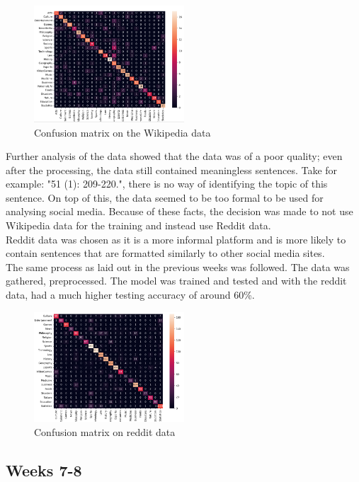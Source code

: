 \begin{figure}[htbp]
    \centering
    \includegraphics[width=0.5\textwidth]{../images/wiki-confusion.png}
    \caption{Confusion matrix on the Wikipedia data}
    \label{fig:wikiconf}
\end{figure}
Further analysis of the data showed that
the data was of a poor quality; even after the processing, the data still contained meaningless sentences. Take for example:
"51 (1): 209-220.", there is no way of identifying the topic of this sentence. On top of this, the data seemed to be too formal to
be used for analysing social media. Because of these facts, the decision was made to not use Wikipedia data for the training and instead
use Reddit data.\\
Reddit data was chosen as it is a more informal platform and is more likely to contain sentences that are formatted similarly to
other social media sites.\\
The same process as laid out in the previous weeks was followed. The data was gathered, preprocessed. The model was trained and tested
and with the reddit data, had a much higher testing accuracy of around 60\%.
\newpage
\begin{figure}[htbp]
    \centering
    \includegraphics[width=0.5\textwidth]{../images/reddit-confusion.png}
    \caption{Confusion matrix on reddit data}
    \label{fig:reditconf}
\end{figure}

\subsection{Weeks 7-8}
